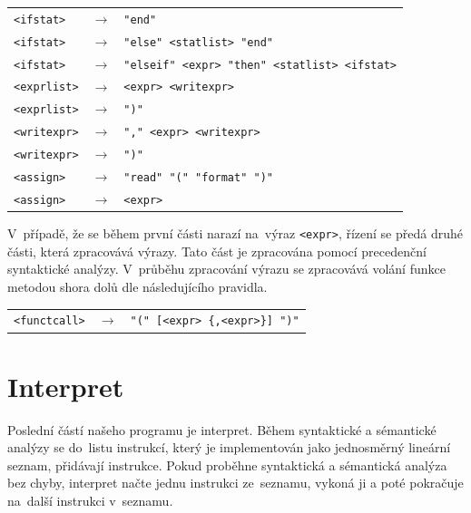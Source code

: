 \documentclass[12pt,a4paper,titlepage,final]{article}
\begin{document}
\begin{flushleft}
\begin{footnotesize}
\begin{tabular}{lll}
\texttt{<ifstat>}&$\rightarrow$&\texttt{"end"}\\
\texttt{<ifstat>}&$\rightarrow$&\texttt{"else"\ <statlist>\ "end"}\\
\texttt{<ifstat>}&$\rightarrow$&\texttt{"elseif"\ <expr>\ "then"\ <statlist>\ <ifstat>}\\
\texttt{<exprlist>}&$\rightarrow$&\texttt{<expr>\ <writexpr>}\\
\texttt{<exprlist>}&$\rightarrow$&\texttt{")"}\\
\texttt{<writexpr>}&$\rightarrow$&\texttt{","\ <expr>\ <writexpr>}\\
\texttt{<writexpr>}&$\rightarrow$&\texttt{")"}\\
\texttt{<assign>}&$\rightarrow$&\texttt{"read"\ "("\ "format"\ ")"}\\
\texttt{<assign>}&$\rightarrow$&\texttt{<expr>}\\
\end{tabular}
\end{footnotesize}
\end{flushleft}

V~případě, že se během první části narazí na~výraz \texttt{<expr>}, řízení se předá
druhé části, která zpracovává výrazy. Tato část je zpracována pomocí
precedenční syntaktické analýzy. V~průběhu zpracování výrazu se zpracovává
volání funkce metodou shora dolů dle následujícího pravidla.

\begin{flushleft}
\begin{footnotesize}
\begin{tabular}{lll}
\texttt{<functcall>}&$\rightarrow$&\texttt{"(" [<expr> \{,<expr>\}] ")"}
\end{tabular}
\end{footnotesize}
\end{flushleft}

\section{Interpret}
Poslední částí našeho programu je interpret. Během syntaktické a sémantické
analýzy se do~listu instrukcí, který je implementován jako jednosměrný
lineární seznam, přidávají instrukce. Pokud proběhne syntaktická a sémantická
analýza bez chyby, interpret načte jednu instrukci ze~seznamu, vykoná ji a
poté pokračuje na~další instrukci v~seznamu.
\end{document}
